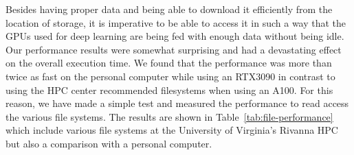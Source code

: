 \documentclass[utf8]{FrontiersinVancouver} %
\begin{document}
Besides having proper data and being able to download it efficiently from the location of storage, it is imperative to be able to access it in such a way that the GPUs used for deep learning are being fed with enough data without being idle. Our performance results were somewhat surprising and had a devastating effect on the overall execution time. We found that the performance was more than twice as fast on the personal computer while using an RTX3090 in contrast to using the HPC center recommended filesystems when using an A100. For this reason, we have made a simple test and measured the performance to read access the various file systems. The results are shown in Table~\ref{tab:file-performance} which include various file systems at the University of Virginia's Rivanna HPC but also a comparison with a personal computer.

\end{document}
